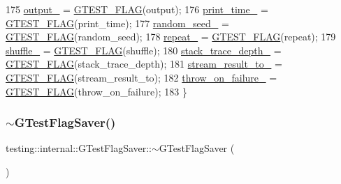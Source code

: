 \begin{DoxyCode}
175     \hyperlink{classtesting_1_1internal_1_1GTestFlagSaver_a65da6ec2943af0a71343efc0e5e96286}{output\_} = \hyperlink{gtest-port_8h_a828f4e34a1c4b510da50ec1563e3562a}{GTEST\_FLAG}(output);
176     \hyperlink{classtesting_1_1internal_1_1GTestFlagSaver_a3a5791fa995e8fd348683afa1d5b0150}{print\_time\_} = \hyperlink{gtest-port_8h_a828f4e34a1c4b510da50ec1563e3562a}{GTEST\_FLAG}(print\_time);
177     \hyperlink{classtesting_1_1internal_1_1GTestFlagSaver_a58abf7990f96e4c8ebee143fbcbb8840}{random\_seed\_} = \hyperlink{gtest-port_8h_a828f4e34a1c4b510da50ec1563e3562a}{GTEST\_FLAG}(random\_seed);
178     \hyperlink{classtesting_1_1internal_1_1GTestFlagSaver_a4c6949cb53b5a89568649d34f8abb5f6}{repeat\_} = \hyperlink{gtest-port_8h_a828f4e34a1c4b510da50ec1563e3562a}{GTEST\_FLAG}(repeat);
179     \hyperlink{classtesting_1_1internal_1_1GTestFlagSaver_af69cb62f7ee26542dd8588507142b478}{shuffle\_} = \hyperlink{gtest-port_8h_a828f4e34a1c4b510da50ec1563e3562a}{GTEST\_FLAG}(shuffle);
180     \hyperlink{classtesting_1_1internal_1_1GTestFlagSaver_a42573c1d61af50aae7e855cb1be07d8d}{stack\_trace\_depth\_} = \hyperlink{gtest-port_8h_a828f4e34a1c4b510da50ec1563e3562a}{GTEST\_FLAG}(stack\_trace\_depth);
181     \hyperlink{classtesting_1_1internal_1_1GTestFlagSaver_a603db2b9ec601e80c18af84b4f5faa13}{stream\_result\_to\_} = \hyperlink{gtest-port_8h_a828f4e34a1c4b510da50ec1563e3562a}{GTEST\_FLAG}(stream\_result\_to);
182     \hyperlink{classtesting_1_1internal_1_1GTestFlagSaver_a9fc0b96db6debd9ff80032eb4c84dc28}{throw\_on\_failure\_} = \hyperlink{gtest-port_8h_a828f4e34a1c4b510da50ec1563e3562a}{GTEST\_FLAG}(throw\_on\_failure);
183   \}
\end{DoxyCode}
\mbox{\label{classtesting_1_1internal_1_1GTestFlagSaver_a5f00786b5c9045fd5dd7c42fd7dd1476}} 
\subsubsection{\texorpdfstring{$\sim$\+G\+Test\+Flag\+Saver()}{~GTestFlagSaver()}}
{\footnotesize\ttfamily testing\+::internal\+::\+G\+Test\+Flag\+Saver\+::$\sim$\+G\+Test\+Flag\+Saver (\begin{DoxyParamCaption}{ }\end{DoxyParamCaption})\hspace{0.3cm}{\ttfamily [inline]}}




